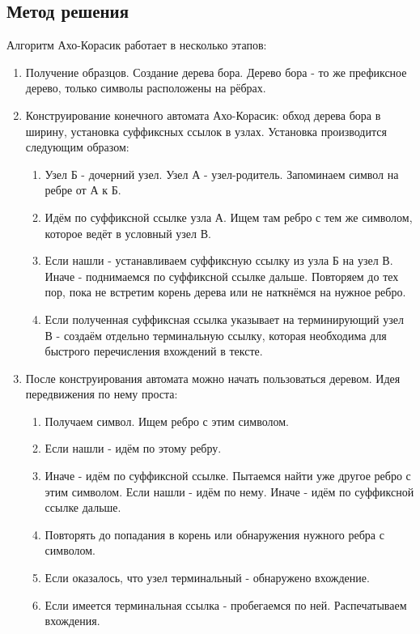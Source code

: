\documentclass[12pt]{article}
\begin{document}
\subsection*{Метод решения}
Алгоритм Ахо-Корасик работает в несколько этапов:
\begin{enumerate}
	\item Получение образцов. Создание дерева бора. Дерево бора - то же префиксное дерево, только символы расположены на рёбрах.
	\item Конструирование конечного автомата Ахо-Корасик: обход дерева бора в ширину, установка суффиксных ссылок в узлах. Установка производится следующим образом:
	\begin{enumerate}
		\item Узел Б - дочерний узел. Узел А - узел-родитель. Запоминаем символ на ребре от А к Б. 
		\item Идём по суффиксной ссылке узла А. Ищем там ребро с тем же символом, которое ведёт в условный узел В. 
		\item Если нашли - устанавливаем суффиксную ссылку из узла Б на узел В. Иначе - поднимаемся по суффиксной ссылке дальше. Повторяем до тех пор, пока не встретим корень дерева или не наткнёмся на нужное ребро.
		\item Если полученная суффиксная ссылка указывает на терминирующий узел В - создаём отдельно терминальную ссылку, которая необходима для быстрого перечисления вхождений в тексте.
	\end{enumerate}
	\item После конструирования автомата можно начать пользоваться деревом. Идея передвижения по нему проста:
	\begin{enumerate}
		\item Получаем символ. Ищем ребро с этим символом. 
		\item Если нашли - идём по этому ребру.
		\item Иначе - идём по суффиксной ссылке. Пытаемся найти уже другое ребро с этим символом. Если нашли - идём по нему. Иначе - идём по суффиксной ссылке дальше.
		\item Повторять до попадания в корень или обнаружения нужного ребра с символом.
		\item Если оказалось, что узел терминальный - обнаружено вхождение.
		\item Если имеется терминальная ссылка - пробегаемся по ней. Распечатываем вхождения.
	\end{enumerate}
\end{enumerate}
\end{document}
